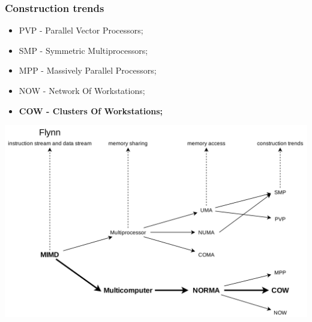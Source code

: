 \documentclass{beamer}
\begin{document}
\begin{frame}
  \frametitle{Construction trends}
  \begin{itemize}
    \item PVP - Parallel Vector Processors;
    \item SMP - Symmetric Multiprocessors;
    \item MPP - Massively Parallel Processors;
    \item NOW - Network Of Workstations;
    \item \textbf{COW - Clusters Of Workstations;}
  \end{itemize}

\end{frame}

\begin{frame}
  \includegraphics[width=\textwidth]{./images/classifications.png}
\end{frame}
\end{document}
